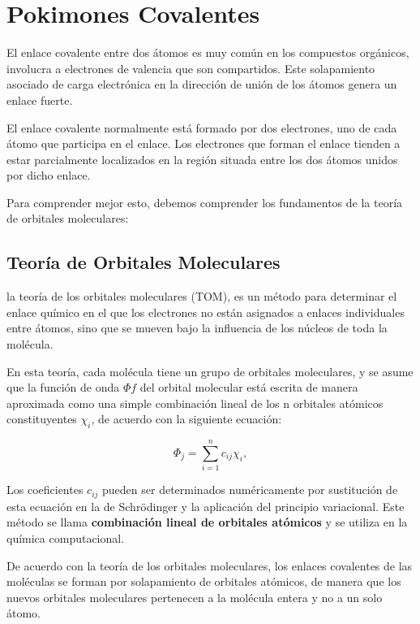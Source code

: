 \documentclass{article}
\begin{document}
\section{Pokimones Covalentes}

El enlace covalente entre dos átomos es muy común en los compuestos orgánicos, involucra a electrones de valencia que son compartidos. Este solapamiento asociado de carga electrónica en la dirección de unión de los átomos genera un enlace fuerte. 

El enlace covalente normalmente está formado por dos electrones, uno de cada átomo que participa en el enlace. Los electrones que forman el enlace tienden a estar parcialmente localizados en la región situada entre los dos átomos unidos por dicho enlace. \cite{Hofmann}

Para comprender mejor esto, debemos comprender los fundamentos de la teoría de orbitales moleculares:

\subsection{Teoría de Orbitales Moleculares}

la teoría de los orbitales moleculares (TOM), es un método para determinar el enlace químico en el que los electrones no están asignados a enlaces individuales entre átomos, sino que se mueven bajo la influencia de los núcleos de toda la molécula.

En esta teoría, cada molécula tiene un grupo de orbitales moleculares, y se asume que la función de onda $\Phi f$ del orbital molecular está escrita de manera aproximada como una simple combinación lineal de los n orbitales atómicos constituyentes $\chi_{i}$, de acuerdo con la siguiente ecuación:

\begin{equation}
    \Phi_{j} = \sum_{i=1}^{n} c_{ij}\chi_{i},
\end{equation}

Los coeficientes $c_{ij}$ pueden ser determinados numéricamente por sustitución de esta ecuación en la de Schrödinger y la aplicación del principio variacional. Este método se llama \textbf{combinación lineal de orbitales atómicos} y se utiliza en la química computacional. 

De acuerdo con la teoría de los orbitales moleculares, los enlaces covalentes de las moléculas se forman por solapamiento de orbitales atómicos, de manera que los nuevos orbitales moleculares pertenecen a la molécula entera y no a un solo átomo. 
\end{document}
